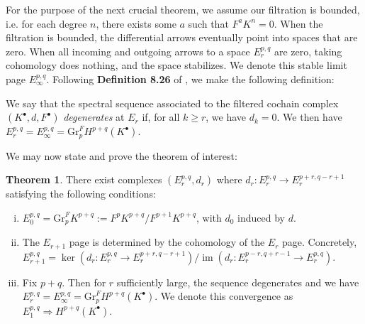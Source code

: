 \documentclass[11pt]{article}
\newcommand{\image}{\operatorname{im}}
\theoremstyle{definition}
\newtheorem{theorem}[equation]{Theorem}
\numberwithin{theorem}{section} %
\numberwithin{equation}{section} %
\begin{document}
\medskip

\noindent For the purpose of the next crucial theorem, we assume our filtration is bounded, i.e. for each degree $n$, there exists some $a$ such that $F^a K^n=0$. When the filtration is bounded, the differential arrows eventually point into spaces that are zero. When all incoming and outgoing arrows to a space $E_r^{p,q}$ are zero, taking cohomology does nothing, and the space stabilizes. We denote this stable limit page $E_\infty^{p,q}$. Following \textbf{Definition 8.26} of \cite{VoisinI2002}, we make the following definition:

\begin{definition}
    We say that the spectral sequence associated to the filtered cochain complex $\left(K^\bullet, d, F^\bullet\right)$ \emph{degenerates} at $E_r$ if, for all $k\geq r$, we have $d_k=0$. We then have $E_r^{p,q} = E_\infty^{p,q} = \mathrm{Gr}_p^F H^{p+q}\left(K^\bullet\right)$.
\end{definition}

\noindent We may now state and prove the theorem of interest:

\begin{theorem}
    There exist complexes $\left(E_r^{p,q}, d_r\right)$ where $d_r:E_r^{p,q} \to E_r^{p+r,q-r+1}$ satisfying the following conditions:
    \begin{enumerate}[i.]
        \item $E_0^{p,q}=\mathrm{Gr}_p^F K^{p+q}:= F^pK^{p+q}/F^{p+1}K^{p+q}$, with $d_0$ induced by $d$.
        \item The $E_{r+1}$ page is determined by the cohomology of the $E_r$ page. Concretely, $E_{r+1}^{p,q} = \ker\left(d_r:E_r^{p,q}\to E_r^{p+r,q-r+1}\right)/\image \left(d_r:E_r^{p-r, q+r-1}\to E_r^{p,q}\right)$. 
        \item Fix $p+q$. Then for $r$ sufficiently large, the sequence degenerates and we have $E_r^{p,q} = E_\infty^{p,q} = \mathrm{Gr}_p^F H^{p+q}\left(K^\bullet\right)$. We denote this convergence as $E_1^{p,q} \Rightarrow H^{p+q}\left(K^\bullet\right)$.
    \end{enumerate}
\end{theorem}
\end{document}
